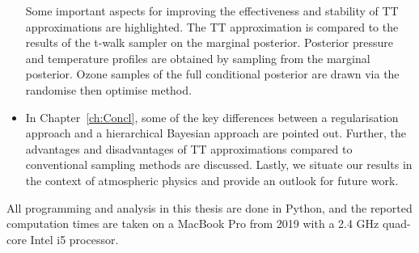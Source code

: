 \begin{itemize}
	Some important aspects for improving the effectiveness and stability of TT approximations are highlighted.
	The TT approximation is compared to the results of the t-walk sampler on the marginal posterior.
	Posterior pressure and temperature profiles are obtained by sampling from the marginal posterior.
	Ozone samples of the full conditional posterior are drawn via the randomise then optimise method.
	\item In Chapter~\ref{ch:Concl}, some of the key differences between a regularisation approach and a hierarchical Bayesian approach are pointed out. Further, the advantages and disadvantages of TT approximations compared to conventional sampling methods are discussed.
	Lastly, we situate our results in the context of atmospheric physics and provide an outlook for future work.
\end{itemize}
All programming and analysis in this thesis are done in Python, and the reported computation times are taken on a MacBook Pro from 2019 with a 2.4 GHz quad-core Intel i5 processor.